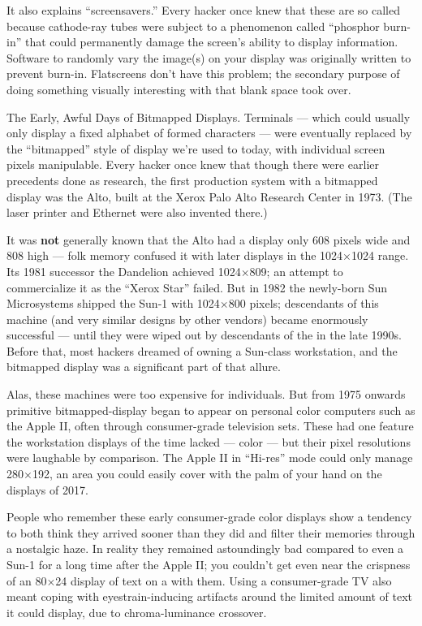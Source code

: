 It also explains ``screensavers.'' Every hacker once knew that these are so
called because cathode-ray tubes were subject to a phenomenon called ``phosphor
burn-in'' that could permanently damage the screen's ability to display
information. Software to randomly vary the image(s) on your display was
originally written to prevent burn-in. Flatscreens don't have this problem; the
secondary purpose of doing something visually interesting with that blank space
took over.

\sect The Early, Awful Days of Bitmapped Displays.
Terminals --- which could usually only display a fixed alphabet of formed
characters --- were eventually replaced by the ``bitmapped'' style of display we're
used to today, with individual screen pixels manipulable. Every hacker once
knew that though there were earlier precedents done as research, the first
production system with a bitmapped display was the Alto, built at the Xerox
Palo Alto Research Center in 1973. (The laser printer and Ethernet were also
invented there.)

It was {\bf not} generally known that the Alto had a display only 608 pixels wide and
808 high --- folk memory confused it with later displays in the 1024$\times$1024 range.
Its 1981 successor the Dandelion achieved 1024$\times$809; an attempt to commercialize
it as the ``Xerox Star'' failed. But in 1982 the newly-born Sun Microsystems
shipped the Sun-1 with 1024$\times$800 pixels; descendants of this machine (and very
similar designs by other vendors) became enormously successful --- until they
were wiped out by descendants of the  in the late 1990s. Before that,
most hackers dreamed of owning a Sun-class workstation, and the bitmapped
display was a significant part of that allure.

Alas, these machines were too expensive for individuals. But from 1975 onwards
primitive bitmapped-display began to appear on personal color computers such as
the Apple II, often through consumer-grade television sets. These had one
feature the workstation displays of the time lacked --- color --- but their pixel
resolutions were laughable by comparison. The Apple II in ``Hi-res'' mode could
only manage 280$\times$192, an area you could easily cover with the palm of your hand
on the displays of 2017.

People who remember these early consumer-grade color displays show a tendency
to both think they arrived sooner than they did and filter their memories
through a nostalgic haze. In reality they remained astoundingly bad compared to
even a Sun-1 for a long time after the Apple II; you couldn't get even near the
crispness of an 80$\times$24 display of text on a  with them. Using a
consumer-grade TV also meant coping with eyestrain-inducing artifacts around
the limited amount of text it could display, due to  chroma-luminance
crossover.

